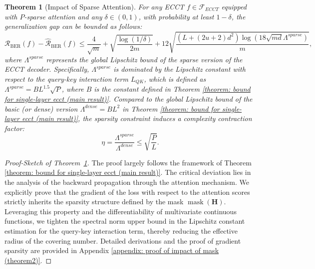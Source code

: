 \documentclass[lettersize,onecolumn]{IEEEtran}
\newtheorem{theorem}{Theorem}
\begin{document}
\begin{theorem}[Impact of Sparse Attention]\label{theorem: impact of mask}
    For any ECCT $f \in \mathcal{F}_{ECCT}$ equipped with $P$-sparse attention and any $\delta \in (0,1)$, with probability at least $1-\delta$, the generalization gap can be bounded as follows:
    \begin{equation}
        \mathcal{R}_{\mathrm{BER}}(f)-\hat{\mathcal{R}}_{\mathrm{BER}}(f) \leq \frac{4}{\sqrt{m}}+\sqrt{\frac{\log (1 / \delta)}{2 m}}+12 \sqrt{\frac{(L+(2 u+2) d^{2}) \log (18 \sqrt{m d}\Lambda^{sparse})}{m}},
    \end{equation}
    where $\Lambda^{sparse}$ represents the global Lipschitz bound of the sparse version of the ECCT decoder. Specifically, $\Lambda^{sparse}$ is dominated by the Lipschitz constant with respect to the query-key interaction term $L_{QK}$, which is defined as $\Lambda^{sparse}=BL^{1.5}\sqrt{P}$, where $B$ is the constant defined in Theorem \ref{theorem: bound for single-layer ecct (main result)}. Compared to the global Lipschitz bound of the basic (or dense) version $\Lambda^{dense}=BL^{2}$ in Theorem \ref{theorem: bound for single-layer ecct (main result)}, the sparsity constraint induces a complexity contraction factor:
    \begin{equation}
        \eta = \frac{\Lambda^{sparse}}{\Lambda^{dense}}\leq \sqrt{\frac{P}{L}}.
    \end{equation}
\end{theorem}


\begin{proof}[Proof-Sketch of Theorem~\ref{theorem: impact of mask}]
    The proof largely follows the framework of Theorem \ref{theorem: bound for single-layer ecct (main result)}. The critical deviation lies in the analysis of the backward propagation through the attention mechanism. We explicitly prove that the gradient of the loss with respect to the attention scores strictly inherits the sparsity structure defined by the mask $\operatorname{mask}(\mathbf{H})$. Leveraging this property and the differentiability of multivariate continuous functions, we tighten the spectral norm upper bound in the Lipschitz constant estimation for the query-key interaction term, thereby reducing the effective radius of the covering number. Detailed derivations and the proof of gradient sparsity are provided in Appendix \ref{appendix: proof of impact of mask (theorem2)}.
\end{proof}
\end{document}
